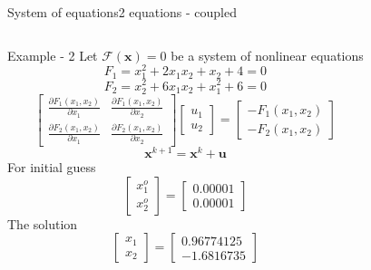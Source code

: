 \documentclass{beamer}
\begin{document}
\begin{frame}{System of equations}{2 equations - coupled}
    \vspace{-2em}
    \begin{columns}[t]
        \begin{block}{\footnotesize Example - 2}
            \scriptsize
            Let $\mathcal{F}(\textbf{x})=0$ be a system of nonlinear equations
            \[F_1 = x_1^{2}+2x_1x_2+x_2+4=0\]
            \vspace{-2em}
            \[F_2 = x_2^{2}+6x_1x_2+x_1^{2}+6=0\]
            \[
                \begin{bmatrix}
                    \frac{\partial F_1(x_1,x_2)}{\partial x_1} & \frac{\partial F_1(x_1,x_2)}{\partial x_2} \\
                    \frac{\partial F_2(x_1,x_2)}{\partial x_1} & \frac{\partial F_2(x_1,x_2)}{\partial x_2}
                \end{bmatrix}
                \begin{bmatrix}
                    u_1 \\ u_2
                \end{bmatrix}
                =
                \begin{bmatrix}
                    -F_1(x_1,x_2) \\
                    -F_2(x_1,x_2) 
                \end{bmatrix}
            \]
            \[\textbf{x}^{k+1}=\textbf{x}^k+\textbf{u}\]
            For initial guess
            \vspace{-1em}
            \[
                \begin{bmatrix}
                    x_1^o \\ x_2^o
                \end{bmatrix}
                =
                \begin{bmatrix}
                    0.00001 \\ 0.00001
                \end{bmatrix}
            \]
            The solution
            \vspace{-1em}
            \[
                \begin{bmatrix}
                    x_1 \\ x_2
                \end{bmatrix}
                =
                \begin{bmatrix}
                    0.96774125 \\ -1.6816735

\end{bmatrix}\]
\end{block}
\end{columns}
\end{frame}
\end{document}
